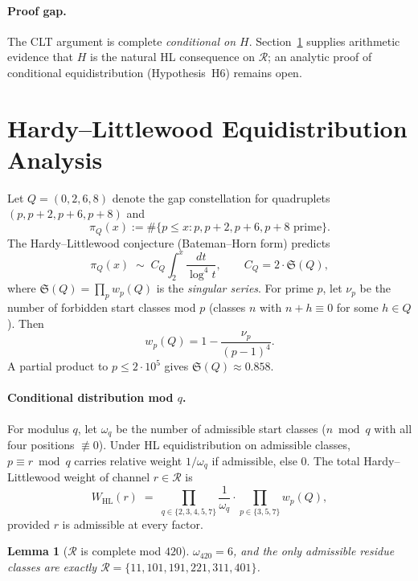 \documentclass[11pt,a4paper]{article}
\newtheorem{lemma}[theorem]{Lemma}
\newcommand{\R}{\mathcal{R}}
\begin{document}
\paragraph{Proof gap.}
The CLT argument is complete \emph{conditional on $H$}.
Section~\ref{sec:hl-analysis} supplies arithmetic evidence that $H$
is the natural HL consequence on $\R$; an analytic proof of conditional
equidistribution (Hypothesis~H6) remains open.

\section{Hardy--Littlewood Equidistribution Analysis}
\label{sec:hl-analysis}

Let $Q=(0,2,6,8)$ denote the gap constellation for quadruplets
$(p,p+2,p+6,p+8)$ and
\[
  \pi_Q(x) := \#\{p\le x : p,p+2,p+6,p+8\text{ prime}\}.
\]
The Hardy--Littlewood conjecture \cite{hardylittlewood1923} (Bateman--Horn
form) predicts
\[
  \pi_Q(x) \;\sim\; C_Q \int_2^x \frac{dt}{\log^4 t},
  \qquad
  C_Q = 2\cdot \mathfrak{S}(Q),
\]
where $\mathfrak{S}(Q)=\prod_p w_p(Q)$ is the \emph{singular series}.
For prime $p$, let $\nu_p$ be the number of forbidden start classes
mod $p$ (classes $n$ with $n+h\equiv 0$ for some $h\in Q$). Then
\begin{equation}
  w_p(Q) = 1 - \frac{\nu_p}{(p-1)^4}.
  \label{eq:wp}
\end{equation}
A partial product to $p\le 2\cdot 10^5$ gives
$\mathfrak{S}(Q)\approx 0.858$.

\paragraph{Conditional distribution mod $q$.}
For modulus $q$, let $\omega_q$ be the number of admissible start classes
($n\bmod q$ with all four positions $\not\equiv 0$).
Under HL equidistribution on admissible classes, $p\equiv r\bmod q$
carries relative weight $1/\omega_q$ if admissible, else $0$.
The total Hardy--Littlewood weight of channel $r\in\R$ is
\begin{equation}
  W_{\mathrm{HL}}(r) \;=\;
  \prod_{q\in\{2,3,4,5,7\}} \frac{1}{\omega_q}
  \cdot \prod_{p\in\{3,5,7\}} w_p(Q),
  \label{eq:channel-weight}
\end{equation}
provided $r$ is admissible at every factor.

\begin{lemma}[$\R$ is complete mod $420$]
\label{lem:R-complete}
$\omega_{420}=6$, and the only admissible residue classes are exactly
$\R=\{11,101,191,221,311,401\}$.
\end{lemma}
\end{document}
